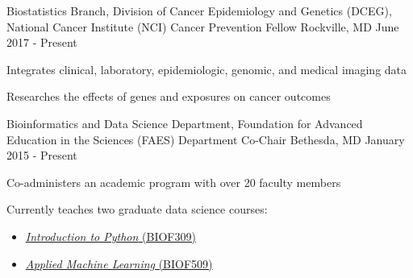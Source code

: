 \vspace{0.1cm}
\begin{cventries}
  \cventry
    {Biostatistics Branch, Division of Cancer Epidemiology and Genetics (DCEG), National Cancer Institute (NCI)}  %
    {Cancer Prevention Fellow} %
    {Rockville, MD} %
    {June 2017 - Present} %
    {
      \begin{cvitems} %
      \item Integrates clinical, laboratory, epidemiologic, genomic, and medical imaging data
\item Researches the effects of genes and exposures on cancer outcomes
      \end{cvitems}
    }

  \cventry
    {Bioinformatics and Data Science Department, Foundation for Advanced Education in the Sciences (FAES)}  %
    {Department Co-Chair} %
    {Bethesda, MD} %
    {January 2015 - Present} %
    {
      \begin{cvitems} %
        \item Co-administers an academic program with over 20 faculty members
        \item {Currently teaches two graduate data science courses: \\
            \begin{minipage}[t]{0.30\textwidth}
             \begin{itemize}
                  \item{ \href{https://github.com/biof309}{\textcolor{awesome-skyblue}{\textit{Introduction to Python} (BIOF309)}}}
            \end{itemize}
            \end{minipage}
            \begin{minipage}[t]{0.35\textwidth}
             \begin{itemize}
                  \item{ \href{https://biof509.github.io/}{\textcolor{awesome-skyblue}{\textit{Applied Machine Learning} (BIOF509)}}}
             \end{itemize}
            \end{minipage}
             }
      \end{cvitems}
    }
    

\end{cventries}
